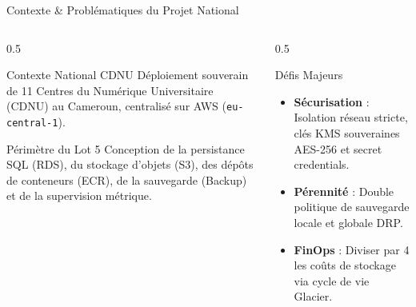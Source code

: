 \documentclass{beamer}
\begin{document}
\begin{frame}{Contexte \& Problématiques du Projet National}
    \begin{columns}[t]
        \begin{column}{0.5\textwidth}
            \begin{block}{\small Contexte National CDNU}
                \scriptsize
                Déploiement souverain de 11 Centres du Numérique Universitaire (CDNU) au Cameroun, centralisé sur AWS (\texttt{eu-central-1}).
            \end{block}
            \begin{block}{\small Périmètre du Lot 5}
                \scriptsize
                Conception de la persistance SQL (RDS), du stockage d'objets (S3), des dépôts de conteneurs (ECR), de la sauvegarde (Backup) et de la supervision métrique.
            \end{block}
        \end{column}
        \begin{column}{0.5\textwidth}
            \begin{block}{\small Défis Majeurs}
                \scriptsize
                \begin{itemize}
                    \item \textbf{Sécurisation} : Isolation réseau stricte, clés KMS souveraines AES-256 et secret credentials.
                    \item \textbf{Pérennité} : Double politique de sauvegarde locale et globale DRP.
                    \item \textbf{FinOps} : Diviser par 4 les coûts de stockage via cycle de vie Glacier.
                \end{itemize}
            \end{block}
        \end{column}
    \end{columns}
\end{frame}
\end{document}
